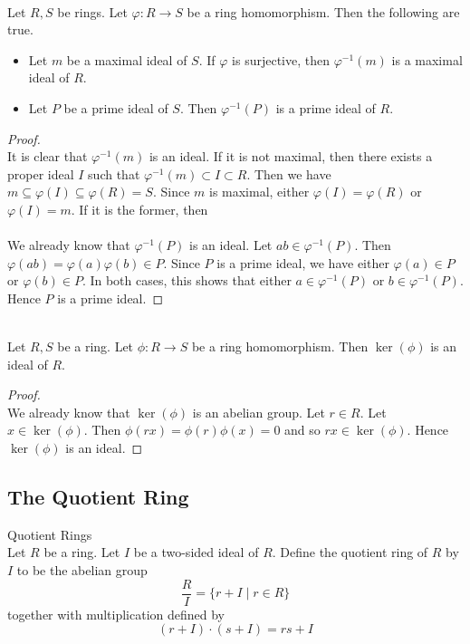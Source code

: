 \documentclass[a4paper]{article}
\begin{document}
\begin{lmm}{}{}\\
Let $R,S$ be rings. Let $\varphi:R\to S$ be a ring homomorphism. Then the following are true. 
\begin{itemize}
\item Let $m$ be a maximal ideal of $S$. If $\varphi$ is surjective, then $\varphi^{-1}(m)$ is a maximal ideal of $R$. 
\item Let $P$ be a prime ideal of $S$. Then $\varphi^{-1}(P)$ is a prime ideal of $R$. 
\end{itemize}
\begin{proof}\\
It is clear that $\varphi^{-1}(m)$ is an ideal. If it is not maximal, then there exists a proper ideal $I$ such that $\varphi^{-1}(m)\subset I\subset R$. Then we have $m\subseteq\varphi(I)\subseteq\varphi(R)=S$. Since $m$ is maximal, either $\varphi(I)=\varphi(R)$ or $\varphi(I)=m$. If it is the former, then \\~\\

We already know that $\varphi^{-1}(P)$ is an ideal. Let $ab\in\varphi^{-1}(P)$. Then $\varphi(ab)=\varphi(a)\varphi(b)\in P$. Since $P$ is a prime ideal, we have either $\varphi(a)\in P$ or $\varphi(b)\in P$. In both cases, this shows that either $a\in\varphi^{-1}(P)$ or $b\in\varphi^{-1}(P)$. Hence $P$ is a prime ideal. 
\end{proof}
\end{lmm}

\begin{prp}{}{}\\
Let $R,S$ be a ring. Let $\phi:R\to S$ be a ring homomorphism. Then $\ker(\phi)$ is an ideal of $R$. 
\begin{proof}\\
We already know that $\ker(\phi)$ is an abelian group. Let $r\in R$. Let $x\in\ker(\phi)$. Then $\phi(rx)=\phi(r)\phi(x)=0$ and so $rx\in\ker(\phi)$. Hence $\ker(\phi)$ is an ideal. 
\end{proof}
\end{prp}

\subsection{The Quotient Ring}
\begin{defn}{Quotient Rings}{}\\
Let $R$ be a ring. Let $I$ be a two-sided ideal of $R$. Define the quotient ring of $R$ by $I$ to be the abelian group $$\frac{R}{I}=\{r+I\;|\;r\in R\}$$ together with multiplication defined by $$(r+I)\cdot(s+I)=rs+I$$
\end{defn}
\end{document}
